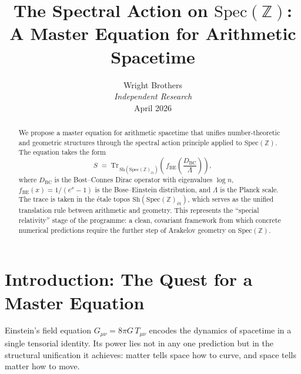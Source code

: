 \documentclass[11pt,a4paper]{article}
\title{The Spectral Action on $\mathrm{Spec}(\mathbb{Z})$:\\
A Master Equation for Arithmetic Spacetime}
\author{Wright Brothers\\
\textit{Independent Research}\\
April 2026}
\date{}
\begin{document}
\maketitle

\begin{abstract}
We propose a master equation for arithmetic spacetime that unifies number-theoretic
and geometric structures through the spectral action principle applied to
$\mathrm{Spec}(\mathbb{Z})$. The equation takes the form
\[
  S \;=\; \mathrm{Tr}_{\,\mathrm{Sh}(\mathrm{Spec}(\mathbb{Z})_{\text{\'et}})}
  \!\left(\, f_{\mathrm{BE}}\!\left(\frac{D_{\mathrm{BC}}}{\Lambda}\right)\right),
\]
where $D_{\mathrm{BC}}$ is the Bost--Connes Dirac operator with eigenvalues
$\log n$, $f_{\mathrm{BE}}(x) = 1/(e^x - 1)$ is the Bose--Einstein distribution,
and $\Lambda$ is the Planck scale. The trace is taken in the \'etale topos
$\mathrm{Sh}(\mathrm{Spec}(\mathbb{Z})_{\text{\'et}})$, which serves as the
unified translation rule between arithmetic and geometry. This represents
the ``special relativity'' stage of the programme: a clean, covariant framework
from which concrete numerical predictions require the further step of
Arakelov geometry on $\mathrm{Spec}(\mathbb{Z})$.
\end{abstract}

\tableofcontents

\section{Introduction: The Quest for a Master Equation}
\label{sec:intro}

Einstein's field equation $G_{\mu\nu} = 8\pi G\, T_{\mu\nu}$ encodes the
dynamics of spacetime in a single tensorial identity. Its power lies not in
any one prediction but in the structural unification it achieves: matter
tells space how to curve, and space tells matter how to move.
\end{document}
